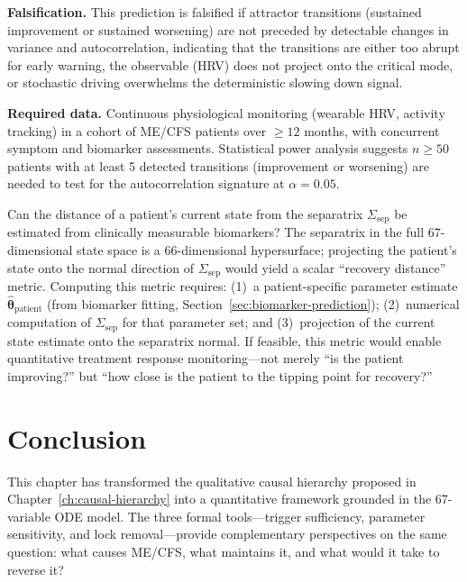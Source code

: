 \textbf{Falsification.} This prediction is falsified if attractor transitions (sustained improvement or sustained worsening) are not preceded by detectable changes in variance and autocorrelation, indicating that the transitions are either too abrupt for early warning, the observable (HRV) does not project onto the critical mode, or stochastic driving overwhelms the deterministic slowing down signal.

\textbf{Required data.} Continuous physiological monitoring (wearable HRV, activity tracking) in a cohort of ME/CFS patients over $\geq 12$ months, with concurrent symptom and biomarker assessments. Statistical power analysis suggests $n \geq 50$ patients with at least 5 detected transitions (improvement or worsening) are needed to test for the autocorrelation signature at $\alpha = 0.05$.

\begin{open_question}
Can the distance of a patient's current state from the separatrix $\Sigma_{\mathrm{sep}}$ be estimated from clinically measurable biomarkers? The separatrix in the full 67-dimensional state space is a 66-dimensional hypersurface; projecting the patient's state onto the normal direction of $\Sigma_{\mathrm{sep}}$ would yield a scalar ``recovery distance'' metric. Computing this metric requires: (1)~a patient-specific parameter estimate $\hat{\boldsymbol{\theta}}_{\text{patient}}$ (from biomarker fitting, Section~\ref{sec:biomarker-prediction}); (2)~numerical computation of $\Sigma_{\mathrm{sep}}$ for that parameter set; and (3)~projection of the current state estimate onto the separatrix normal. If feasible, this metric would enable quantitative treatment response monitoring---not merely ``is the patient improving?'' but ``how close is the patient to the tipping point for recovery?''
\end{open_question}

\section{Conclusion}
\label{sec:ch33-conclusion}

This chapter has transformed the qualitative causal hierarchy proposed in Chapter~\ref{ch:causal-hierarchy} into a quantitative framework grounded in the 67-variable ODE model. The three formal tools---trigger sufficiency, parameter sensitivity, and lock removal---provide complementary perspectives on the same question: what causes ME/CFS, what maintains it, and what would it take to reverse it?

